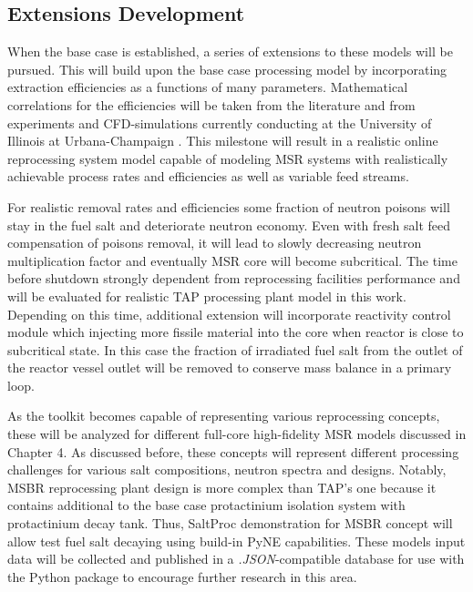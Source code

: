 \subsection{Extensions Development}
When the base case is established, a series of extensions 
to these models will be pursued.
This will build upon the base case processing model by 
incorporating extraction efficiencies as a functions of 
many parameters. Mathematical correlations for the efficiencies 
will be taken from the literature \cite{gabbard_development_1974} 
and from experiments and CFD-simulations currently conducting at 
the University of Illinois at Urbana-Champaign \cite{huff_enabling_2018}.
This milestone will result in a realistic online reprocessing system 
model capable of modeling \gls{MSR} systems with realistically achievable 
process rates and efficiencies as well as variable feed streams. 

For realistic removal rates and efficiencies some fraction of neutron 
poisons will stay in the fuel salt and deteriorate neutron economy. 
Even with fresh salt feed compensation of poisons removal, 
it will lead to slowly decreasing neutron multiplication factor and 
eventually \gls{MSR} core will become subcritical. The time before 
shutdown strongly dependent from reprocessing facilities performance 
and will be evaluated for realistic \gls{TAP} processing plant model 
in this 
work. Depending on this time, additional extension will incorporate 
reactivity control module which injecting more fissile material 
into the core when reactor is close to subcritical state. In this 
case the fraction of irradiated fuel salt from the outlet of the 
reactor vessel outlet will be removed to conserve mass balance 
in a primary loop.

As the toolkit becomes capable of representing various reprocessing 
concepts, these will be analyzed for different full-core 
high-fidelity \gls{MSR} models discussed in Chapter 4. 
As discussed 
before, these concepts will represent different processing challenges 
for various salt compositions, neutron spectra and designs. 
Notably, 
\gls{MSBR} reprocessing plant design is more complex than \gls{TAP}'s 
one because it contains additional to the base case protactinium 
isolation system with protactinium decay tank. Thus, SaltProc 
demonstration for \gls{MSBR} concept will allow test 
fuel salt decaying using build-in PyNE capabilities. 
These models input data will be collected and 
published in a \textit{.JSON}-compatible database for use with the 
Python package to encourage further research in this area.

